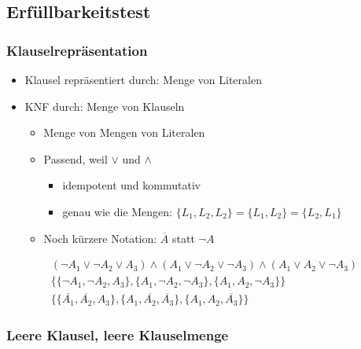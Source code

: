 \documentclass{scrartcl}
\begin{document}
\subsection{Erfüllbarkeitstest}

\subsubsection{Klauselrepräsentation}

\begin{itemize}
	\item Klausel repräsentiert durch: Menge von Literalen
	\item KNF durch: Menge von Klauseln
	\begin{itemize}
		\item Menge von Mengen von Literalen
		\item Passend, weil $\vee$ und $\wedge$
		\begin{itemize}
			\item idempotent und kommutativ
			\item genau wie die Mengen: $\{ L_1, L_2, L_2 \} = \{ L_1, L_2 \} = \{ L_2, L_1 \}$
		\end{itemize}
		\item Noch kürzere Notation: $\overline{A}$ statt $\neg A$
	\end{itemize}
\end{itemize}

\begin{equation}
	\begin{split}
		(\neg A_1 \vee \neg A_2 \vee A_3) \wedge (A_1 \vee \neg A_2 \vee \neg A_3) \wedge (A_1 \vee A_2 \vee \neg A_3) \\
		\{ \{ \neg A_1 , \neg A_2, A_3 \}, \{ A_1, \neg A_2, \neg A_3 \}, \{ A_1, A_2, \neg A_3 \} \} \\
		\{ \{ \overline{A_1}, \overline{A_2}, A_3 \}, \{ A_1, \overline{A_2}, \overline{A_3} \}, \{ A_1, A_2, \overline{A_3} \} \}
	\end{split}
\end{equation}

\subsubsection{Leere Klausel, leere Klauselmenge}
\end{document}
